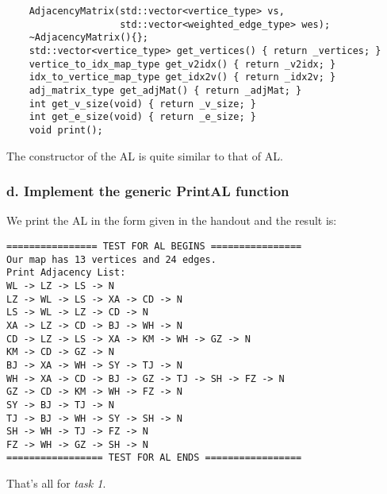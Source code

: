 \begin{verbatim}
    AdjacencyMatrix(std::vector<vertice_type> vs, 
                    std::vector<weighted_edge_type> wes);
    ~AdjacencyMatrix(){};
    std::vector<vertice_type> get_vertices() { return _vertices; }
    vertice_to_idx_map_type get_v2idx() { return _v2idx; }
    idx_to_vertice_map_type get_idx2v() { return _idx2v; }
    adj_matrix_type get_adjMat() { return _adjMat; }
    int get_v_size(void) { return _v_size; }
    int get_e_size(void) { return _e_size; }
    void print();
\end{verbatim}

The constructor of the AL is quite similar to that of AL.

\subsubsection*{d. Implement the generic \textbf{PrintAL} function}
We print the AL in the form given in the handout and the result is:

\begin{verbatim}
================ TEST FOR AL BEGINS ================
Our map has 13 vertices and 24 edges.
Print Adjacency List:
WL -> LZ -> LS -> N
LZ -> WL -> LS -> XA -> CD -> N
LS -> WL -> LZ -> CD -> N
XA -> LZ -> CD -> BJ -> WH -> N
CD -> LZ -> LS -> XA -> KM -> WH -> GZ -> N
KM -> CD -> GZ -> N
BJ -> XA -> WH -> SY -> TJ -> N
WH -> XA -> CD -> BJ -> GZ -> TJ -> SH -> FZ -> N
GZ -> CD -> KM -> WH -> FZ -> N
SY -> BJ -> TJ -> N
TJ -> BJ -> WH -> SY -> SH -> N
SH -> WH -> TJ -> FZ -> N
FZ -> WH -> GZ -> SH -> N
================= TEST FOR AL ENDS =================
\end{verbatim}

That's all for \textit{task 1}.